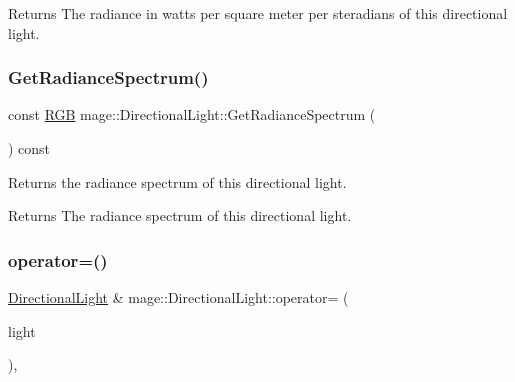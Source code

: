 \begin{DoxyReturn}{Returns}
The radiance in watts per square meter per steradians of this directional light. 
\end{DoxyReturn}
\hypertarget{classmage_1_1_directional_light_a137cef14d20df2c907884a04ae2019ff}{}\label{classmage_1_1_directional_light_a137cef14d20df2c907884a04ae2019ff} 
\subsubsection{\texorpdfstring{Get\+Radiance\+Spectrum()}{GetRadianceSpectrum()}}
{\footnotesize\ttfamily const \hyperlink{structmage_1_1_r_g_b}{R\+GB} mage\+::\+Directional\+Light\+::\+Get\+Radiance\+Spectrum (\begin{DoxyParamCaption}{ }\end{DoxyParamCaption}) const\hspace{0.3cm}{\ttfamily [noexcept]}}

Returns the radiance spectrum of this directional light.

\begin{DoxyReturn}{Returns}
The radiance spectrum of this directional light. 
\end{DoxyReturn}
\hypertarget{classmage_1_1_directional_light_acf66f214974d9fb60844c16e02c49b22}{}\label{classmage_1_1_directional_light_acf66f214974d9fb60844c16e02c49b22} 
\subsubsection{\texorpdfstring{operator=()}{operator=()}\hspace{0.1cm}{\footnotesize\ttfamily [1/2]}}
{\footnotesize\ttfamily \hyperlink{classmage_1_1_directional_light}{Directional\+Light} \& mage\+::\+Directional\+Light\+::operator= (\begin{DoxyParamCaption}\item[{const \hyperlink{classmage_1_1_directional_light}{Directional\+Light} \&}]{light }\end{DoxyParamCaption})\hspace{0.3cm}{\ttfamily [default]}, {\ttfamily [noexcept]}}

